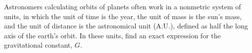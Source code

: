         Astronomers calculating orbits of planets often work in a nonmetric system of
        units, in which the unit of time is the year, the unit of mass is the sun's mass,
        and the unit of distance is the
        astronomical unit (A.U.), defined as half the long axis of the earth's orbit.
        In these units, find an exact expression for the gravitational constant, $G$.\answercheck
